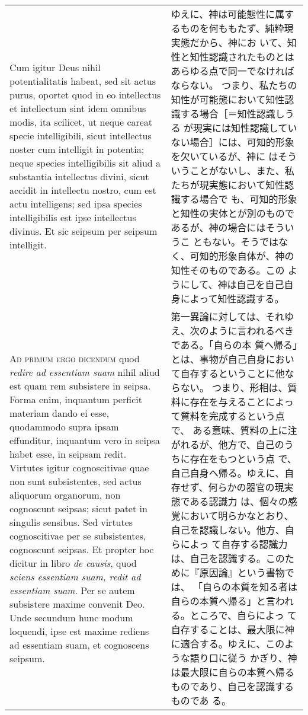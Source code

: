 \documentclass[10pt]{jsarticle} %
\begin{document}
\begin{longtable}{p{21em}p{21em}}
Cum igitur Deus nihil potentialitatis habeat, sed sit actus purus,
oportet quod in eo intellectus et intellectum sint idem omnibus modis,
ita scilicet, ut neque careat specie intelligibili, sicut intellectus
noster cum intelligit in potentia; neque species intelligibilis sit
aliud a substantia intellectus divini, sicut accidit in intellectu
nostro, cum est actu intelligens; sed ipsa species intelligibilis est
ipse intellectus divinus. Et sic seipsum per seipsum intelligit.

&

ゆえに、神は可能態性に属するものを何ももたず、純粋現実態だから、神にお
いて、知性と知性認識されたものとはあらゆる点で同一でなければならない。
つまり、私たちの知性が可能態において知性認識する場合［＝知性認識しうる
が現実には知性認識していない場合］には、可知的形象を欠いているが、神に
はそういうことがないし、また、私たちが現実態において知性認識する場合で
も、可知的形象と知性の実体とが別のものであるが、神の場合にはそういうこ
ともない。そうではなく、可知的形象自体が、神の知性そのものである。この
ようにして、神は自己を自己自身によって知性認識する。

\\


{\scshape Ad primum ergo dicendum} quod {\itshape redire ad essentiam
suam} nihil aliud est quam rem subsistere in seipsa. Forma enim,
inquantum perficit materiam dando ei esse, quodammodo supra ipsam
effunditur, inquantum vero in seipsa habet esse, in seipsam
redit. Virtutes igitur cognoscitivae quae non sunt subsistentes, sed
actus aliquorum organorum, non cognoscunt seipsas; sicut patet in
singulis sensibus. Sed virtutes cognoscitivae per se subsistentes,
cognoscunt seipsas. Et propter hoc dicitur in libro {\itshape de
causis}, quod {\itshape sciens essentiam suam, redit ad essentiam
suam}. Per se autem subsistere maxime convenit Deo. Unde secundum hunc
modum loquendi, ipse est maxime rediens ad essentiam suam, et
cognoscens seipsum.

&


第一異論に対しては、それゆえ、次のように言われるべきである。「自らの本
質へ帰る」とは、事物が自己自身において自存するということに他ならない。
つまり、形相は、質料に存在を与えることによって質料を完成するという点で、
ある意味、質料の上に注がれるが、他方で、自己のうちに存在をもつという点
で、自己自身へ帰る。ゆえに、自存せず、何らかの器官の現実態である認識力
は、個々の感覚において明らかなとおり、自己を認識しない。他方、自らによっ
て自存する認識力は、自己を認識する。このために『原因論』という書物では、
「自らの本質を知る者は自らの本質へ帰る」と言われる。ところで、自らによっ
て自存することは、最大限に神に適合する。ゆえに、このような語り口に従う
かぎり、神は最大限に自らの本質へ帰るものであり、自己を認識するものであ
る。


\end{longtable}
\end{document}
